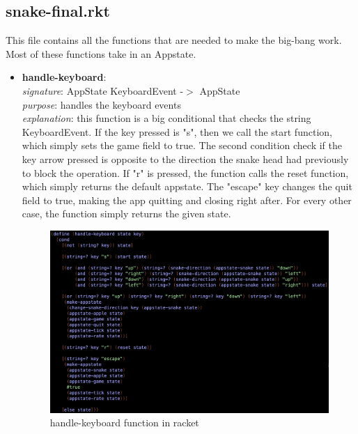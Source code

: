 \documentclass{article}
\begin{document}
	\subsection{snake-final.rkt}
	This file contains all the functions that are needed to make the big-bang work. 
	Most of these functions take in an Appstate.
	\begin{itemize}
		\item \textbf{handle-keyboard}: \\
			\emph{signature}: AppState KeyboardEvent -$>$ AppState \\
			\emph{purpose}: handles the keyboard events \\
			\emph{explanation}: this function is a big conditional that checks the string KeyboardEvent. If the key pressed is "s", then we call the start function, which simply sets the game field to true. The second condition check if the key arrow pressed is opposite to the direction the snake head had previously to block the operation. If "r" is pressed, the function calls the reset function, which simply returns the default appstate. The "escape" key changes the quit field to true, making the app quitting and closing right after. For every other case, the function simply returns the given state.
			\begin{figure}[h!]
				\centering
				\includegraphics[width=.6\linewidth]{handle-keyboard.png}
				\caption{handle-keyboard function in racket}
			\end{figure}
			

\end{itemize}
\end{document}
